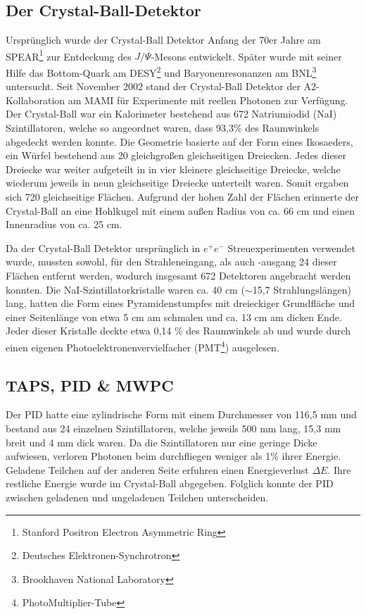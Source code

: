 \documentclass[a4paper,11pt,oneside,final,german,openbib,pdftex]{scrbook}
\begin{document}
{\subsection{Der Crystal-Ball-Detektor}
Ursprünglich wurde der Crystal-Ball Detektor Anfang der 70er Jahre am SPEAR\footnote{Stanford Positron Electron Asymmetric Ring} zur Entdeckung des $J/\Psi$-Mesons entwickelt. Später wurde mit seiner Hilfe das Bottom-Quark am DESY\footnote{Deutsches Elektronen-Synchrotron} und Baryonenresonanzen am BNL\footnote{Brookhaven National Laboratory} untersucht.
Seit November 2002 stand der Crystal-Ball Detektor der A2-Kollaboration am MAMI für Experimente mit reellen Photonen zur Verfügung.
\newline
Der Crystal-Ball war ein Kalorimeter bestehend aus 672 Natriumiodid (NaI) Szintillatoren, welche so angeordnet waren, dass 93,3\% des Raumwinkels abgedeckt werden konnte. 
Die Geometrie basierte auf der Form eines Ikosaeders, ein W\"urfel bestehend aus 20 gleichgro{\ss}en  gleichseitigen Dreiecken. Jedes dieser Dreiecke war weiter aufgeteilt in in vier kleinere gleichseitige Dreiecke, welche wiederum jeweils in neun gleichseitige Dreiecke unterteilt waren. Somit ergaben sich 720 gleichseitige Fl\"achen. Aufgrund der hohen Zahl der Fl\"achen erinnerte der Crystal-Ball an eine Hohlkugel mit einem au{\ss}en Radius von ca. 66 cm und einen Innenradius von ca. 25 cm. 

Da der Crystal-Ball Detektor urspr\"unglich in $e^+e^-$ Streuexperimenten verwendet wurde, mussten sowohl, f\"ur den Strahleneingang, als auch -ausgang 24 dieser Fl\"achen entfernt werden, wodurch insgesamt 672 Detektoren angebracht werden konnten. Die NaI-Szintillatorkristalle waren ca. 40 cm ($\sim$15,7 Strahlungsl\"angen) lang, hatten die Form eines Pyramidenstumpfes mit dreieckiger Grundfl\"ache und einer Seitenl\"ange von etwa 5 cm am schmalen und ca. 13 cm am dicken Ende. Jeder dieser Kristalle deckte etwa 0,14 \% des Raumwinkels ab und wurde durch einen eigenen Photoelektronenvervielfacher (PMT\footnote{PhotoMultiplier-Tube}) ausgelesen. 



\subsection{TAPS, PID \& MWPC}
\label{sec:TAPS-PID-MWPC}
Der PID hatte eine zylindrische Form mit einem Durchmesser von 116,5 mm und bestand aus 24 einzelnen Szintillatoren, welche jeweils 500 mm lang, 15,3 mm breit und 4 mm dick waren. Da die Szintillatoren nur eine geringe Dicke aufwiesen, verloren Photonen beim durchfliegen weniger als 1\% ihrer Energie. Geladene Teilchen auf der anderen Seite erfuhren einen Energieverlust $\Delta E$. Ihre restliche Energie wurde im Crystal-Ball abgegeben. Folglich konnte der PID zwischen geladenen und ungeladenen Teilchen unterscheiden. 

}
\end{document}
